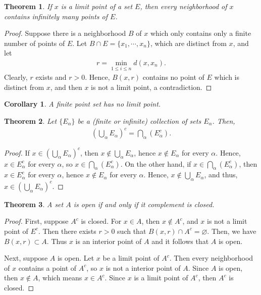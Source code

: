 \documentclass[10pt]{book}
\newtheorem{theorem}{Theorem}[chapter]
\newtheorem{corollary}{Corollary}[theorem]
\theoremstyle{definition}
\numberwithin{equation}{chapter}
\begin{document}
\medskip

\begin{theorem}
If $x$ is a limit point of a set $E$, then every neighborhood of $x$ contains infinitely many points of $E$.
\end{theorem}
\begin{proof}
Suppose there is a neighborhood $B$ of $x$ which only contains only a finite number of points of $E$. Let $B \cap E = \{x_1, \cdots, x_n\}$, which are distinct from $x$, and let 
\begin{align*}
    r = \min_{1\leq i\leq n} d(x, x_n).
\end{align*}
Clearly, $r$ exists and $r > 0$. Hence, $B(x,r)$ contains no point of $E$ which is distinct from $x$, and then $x$ is not a limit point, a contradiction. 
\end{proof}

\medskip

\begin{corollary}
A finite point set has no limit point.
\end{corollary}

\medskip

\begin{theorem}\label{th_18}
Let $\{E_{\alpha}\}$ be a (finite or infinite) collection of sets $E_{\alpha}$. Then,
\begin{align*}
    \left(\bigcup_{\alpha} E_{\alpha}\right)^c = \bigcap_{\alpha} (E_{\alpha}^c).
\end{align*}
\end{theorem}
\begin{proof}
If $x \in \left(\bigcup_{\alpha} E_{\alpha}\right)^c$, then $x \notin \bigcup_{\alpha} E_{\alpha}$, hence $x \notin E_{\alpha}$ for every $\alpha$. Hence, $x \in E_{\alpha}^c$ for every $\alpha$, so $x \in \bigcap_{\alpha} (E_{\alpha}^c)$.
On the other hand, if $x \in \bigcap_{\alpha} (E_{\alpha}^c)$, then $x \in E_{\alpha}^c$ for every $\alpha$, hence $x \notin E_{\alpha}$ for every $\alpha$. Hence, $x \notin \bigcup_{\alpha} E_{\alpha}$, and thus, $x \in \left(\bigcup_{\alpha} E_{\alpha}\right)^c$. 
\end{proof}

\medskip

\begin{theorem}\label{th_19}
A set $A$ is open if and only if it complement is closed.
\end{theorem}
\begin{proof}
First, suppose $A^c$ is closed. For $x\in A$, then $x\notin A^c$, and $x$ is not a limit point of $E^c$. Then there exists $r>0$ such that $B(x,r) \cap A^c = \varnothing$. Then, we have $B(x,r) \subset A$. Thus $x$ is an interior point of $A$ and it follows that $A$ is open.

Next, suppose $A$ is open. Let $x$ be a limit point of $A^c$. Then every neighborhood of $x$ contains a point of $A^c$, so $x$ is not a interior point of $A$. Since $A$ is open, then $x\notin A$, which means $x\in A^c$. Since $x$ is a limit point of $A^c$, then $A^c$ is closed.
\end{proof}
\end{document}
